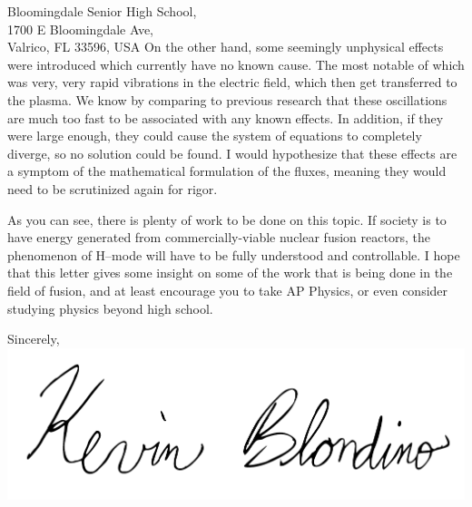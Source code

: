 \documentclass[12pt,a4paper]{letter}
\makeatletter
\renewcommand{\closing}[1]{\par\nobreak\vspace{\parskip}%
	\stopbreaks
		\noindent
	\ifx\@empty\fromaddress\else
		\hspace*{\longindentation}\fi
	\parbox{\indentedwidth}{\raggedright
			\ignorespaces #1\\[1\medskipamount]%
			\ifx\@empty\fromsig
				\fromname
			\else \fromsig \fi\strut}%
		\par}
\makeatother
\begin{document}
\begin{letter}{
	Bloomingdale Senior High School,\\
	1700 E Bloomingdale Ave,\\
	Valrico, FL 33596, USA
}
On the other hand, some seemingly unphysical effects were introduced which currently have no known cause.
The most notable of which was very, very rapid vibrations in the electric field, which then get transferred to the plasma.
We know by comparing to previous research that these oscillations are much too fast to be associated with any known effects.
In addition, if they were large enough, they could cause the system of equations to completely diverge, so no solution could be found.
I would hypothesize that these effects are a symptom of the mathematical formulation of the fluxes, meaning they would need to be scrutinized again for rigor.

As you can see, there is plenty of work to be done on this topic.
If society is to have energy generated from commercially-viable nuclear fusion reactors, the phenomenon of H--mode will have to be fully understood and controllable.
I hope that this letter gives some insight on some of the work that is being done in the field of fusion, and at least encourage you to take AP Physics, or even consider studying physics beyond high school.

\vspace*{10mm}

\closing{Sincerely,
\includegraphics[scale=0.35]{./Signature_Cropped.pdf}
}


\end{letter}
\end{document}
